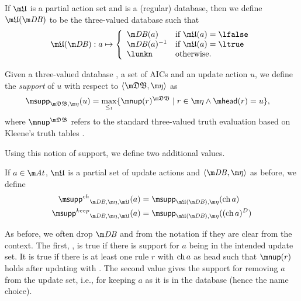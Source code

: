 If $\UUU$ is a partial action set and \db is a (regular) database, then we define $\UUU(\db)$ to be the three-valued database such that 
\[ \UUU(\db): a \mapsto \left \{\begin{array}{ll}
                                 \db(a) & \text{if }\UUU(a) = \lfalse\\
                                 \db(a)^{-1} & \text{if }\UUU(a) = \ltrue\\
                                 \lunkn & \text{otherwise.}
                                \end{array}\right.
                                \]



\begin{definition}\label{def:support}
Given a three-valued database \tdb, a set of AICs \aics and an update action $u$,  we define the \emph{support} of $u$ with respect to $\langle \tdb, \aics\rangle$ as 
\begin{align*}
 \supp_{\tdb,\aics}(u) &= \max_{\leq_t}\{\nup(r)^{\tdb}\mid r\in \aics \land \head(r) = u\},
\end{align*}
where $\nup^{\tdb}$ refers to the standard three-valued truth evaluation based on Kleene's truth tables \cite{Kleene38}.
\end{definition}

Using this notion of support, we define two additional values. 

\begin{definition}
If $a\in \atoms$, $\UUU$ is a partial set of update actions and $\langle \db, \aics\rangle$ as before, we define 
\begin{align*}
 \suppin_{\db,\aics,\UUU}(a) &= \supp_{\UUU(\db), \aics}(\change a)\\
  \suppout_{\db,\aics,\UUU}(a) &= \supp_{\UUU(\db), \aics}((\change a)^D)
\end{align*}
\end{definition}
As before, we often drop $\db$ and \aics from the notation if they are clear from the context. 
The first, \suppin, is true if there is support for $a$ being in the intended update set. It is true if there is at least one rule $r$ with $\operatorname{ch} a$ as head such that $\nup(r)$ holds after updating \db with \UUU. The second value gives the support for removing $a$ from the update set, i.e., for keeping $a$ as it is in the database (hence the name choice). 






